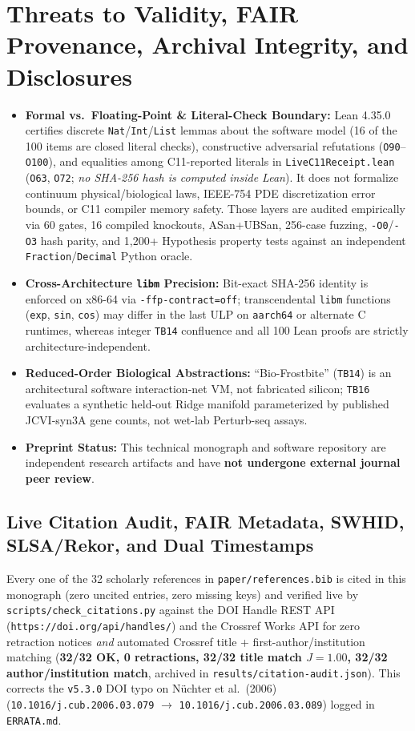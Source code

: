 \documentclass[11pt,reqno]{amsart}
\begin{document}
\section{Threats to Validity, FAIR Provenance, Archival Integrity, and Disclosures}
\label{sec:limitations}

\begin{itemize}
  \item \textbf{Formal vs.\ Floating-Point \& Literal-Check Boundary:} Lean 4.35.0 certifies discrete \texttt{Nat}/\texttt{Int}/\texttt{List} lemmas about the software model (16 of the 100 items are closed literal checks), constructive adversarial refutations (\texttt{O90}--\texttt{O100}), and equalities among C11-reported literals in \nolinkurl{LiveC11Receipt.lean} (\texttt{O63}, \texttt{O72}; \emph{no SHA-256 hash is computed inside Lean}). It does not formalize continuum physical/biological laws, IEEE-754 PDE discretization error bounds, or C11 compiler memory safety. Those layers are audited empirically via 60 gates, 16 compiled knockouts, ASan+UBSan, 256-case fuzzing, \texttt{-O0}/\texttt{-O3} hash parity, and 1,200+ Hypothesis property tests against an independent \texttt{Fraction}/\texttt{Decimal} Python oracle.
  \item \textbf{Cross-Architecture \texttt{libm} Precision:} Bit-exact SHA-256 identity is enforced on x86-64 via \texttt{-ffp-contract=off}; transcendental \texttt{libm} functions (\texttt{exp}, \texttt{sin}, \texttt{cos}) may differ in the last ULP on \texttt{aarch64} or alternate C runtimes, whereas integer \texttt{TB14} confluence and all 100 Lean proofs are strictly architecture-independent.
  \item \textbf{Reduced-Order Biological Abstractions:} ``Bio-Frostbite'' (\texttt{TB14}) is an architectural software interaction-net VM, not fabricated silicon; \texttt{TB16} evaluates a synthetic held-out Ridge manifold parameterized by published JCVI-syn3A gene counts, not wet-lab Perturb-seq assays.
  \item \textbf{Preprint Status:} This technical monograph and software repository are independent research artifacts and have \textbf{not undergone external journal peer review}.
\end{itemize}

\subsection{Live Citation Audit, FAIR Metadata, SWHID, SLSA/Rekor, and Dual Timestamps}
Every one of the 32 scholarly references in \nolinkurl{paper/references.bib} is cited in this monograph (zero uncited entries, zero missing keys) and verified live by \nolinkurl{scripts/check_citations.py} against the DOI Handle REST API (\nolinkurl{https://doi.org/api/handles/}) and the Crossref Works API for zero retraction notices \emph{and} automated Crossref title + first-author/institution matching (\textbf{32/32 OK, 0 retractions, 32/32 title match $J=1.00$, 32/32 author/institution match}, archived in \nolinkurl{results/citation-audit.json}). This corrects the \texttt{v5.3.0} DOI typo on N\"uchter et al.\ (2006) (\texttt{10.1016/j.cub.2006.03.079} $\to$ \texttt{10.1016/j.cub.2006.03.089}) logged in \nolinkurl{ERRATA.md}.
\end{document}
